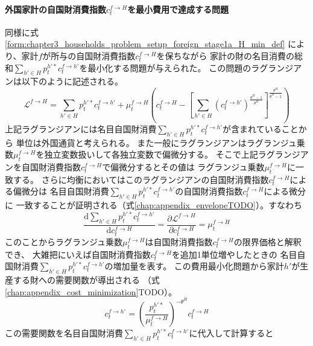 \paragraph{外国家計の自国財消費指数\(c_t^{f\to H}\)を最小費用で達成する問題}
\label{sec:chapter3_households_stage1a_foreign_c_f_H_problem}
同様に式
\eqref{form:chapter3_households_problem_setup_foreign_stage1a_H_min_def}
により、家計\(f\)が所与の自国財消費指数\(c_t^{f\to H}\)を保ちながら
家計の財の名目消費の総和\(\sum_{h'\in H}p_t^{h'*}c_t^{f\to h'}\)を最小化する問題が与えられた。
この問題のラグランジアンは以下のように記述される。
\begin{equation}
\label{form:chapter3_households_stage1a_foreign_c_f_H_problem_lagrangian_def}
    \mathcal{L}^{f\to H}=\sum_{h'\in H}p_t^{h'*}c_t^{f\to h'}+\mu_t^{f\to H}\left(c_t^{f\to H}-\left[\sum_{h'\in H}(c_t^{f\to h'})^{\frac{\theta^H-1}{\theta^H}}\right]^{\frac{\theta^H}{\theta^H-1}}\right)
\end{equation}
上記ラグランジアンには名目自国財消費\(\sum_{h'\in H}p_t^{h'*}c_t^{f\to h'}\)が含まれていることから
単位は外国通貨と考えられる。
また一般にラグランジアンはラグランジュ乗数\(\mu_t^{f\to H}\)を独立変数扱いして各独立変数で偏微分する。
そこで上記ラグランジアンを自国財消費指数\(c_t^{f\to H}\)で偏微分するとその値は
ラグランジュ乗数\(\mu_t^{f\to H}\)に一致する。
さらに均衡においてはこのラグランジアンの自国財消費指数\(c_t^{f\to H}\)による偏微分は
名目自国財消費\(\sum_{h'\in H}p_t^{h'*}c_t^{f\to h'}\)の自国財消費指数\(c_t^{f\to H}\)による微分に
一致することが証明される（式\eqref{chap:appendix_envelopeTODO}）。すなわち
\begin{equation}
\label{form:chapter3_households_stage1a_foreign_c_f_H_problem_mu_f_H_marginal_eq}
    \frac{\mathrm{d}\sum_{h'\in H}p_t^{h'*}c_t^{f\to h'}}{\mathrm{d}c_t^{f\to H}}=\frac{\partial \mathcal{L}^{f\to H}}{\partial c_t^{f\to H}}=\mu_t^{f\to H}
\end{equation}
このことからラグランジュ乗数\(\mu_t^{f\to H}\)は自国財消費指数\(c_t^{f\to H}\)の限界価格と解釈でき、
大雑把にいえば自国財消費指数\(c_t^{f\to H}\)を追加1単位増やしたときの
名目自国財消費\(\sum_{h'\in H}p_t^{h'*}c_t^{f\to h'}\)の増加量を表す。
この費用最小化問題から家計\(h'\)が生産する財への需要関数が導出される
（式\eqref{chap:appendix_cost_minimization}TODO）。
\begin{equation}
\label{form:chapter3_households_stage1a_foreign_c_f_H_problem_c_f_h_eq}
    c_t^{f\to h'}=\left(\frac{p_t^{h'*}}{\mu_t^{f\to H}}\right)^{-\theta^H}c_t^{f\to H}
\end{equation}
この需要関数を名目自国財消費\(\sum_{h'\in H}p_t^{h'*}c_t^{f\to h'}\)に代入して計算すると
